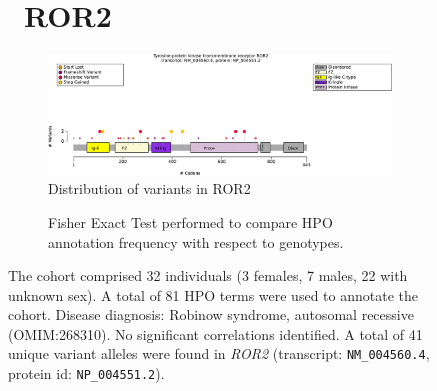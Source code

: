 \begin{figure}[htbp]
\section*{ ROR2}
\centering
\begin{subfigure}[b]{0.95\textwidth}
\centering
\includegraphics[width=\textwidth]{ img/ROR2_protein_diagram.pdf} 
\captionsetup{justification=raggedright,singlelinecheck=false}
\caption{Distribution of variants in ROR2}
\end{subfigure}

\vspace{2em}

\begin{subfigure}[b]{0.95\textwidth}
\centering
{}
\captionsetup{justification=raggedright,singlelinecheck=false}
\caption{Fisher Exact Test performed to compare HPO annotation frequency with respect to genotypes.}
\end{subfigure}

\vspace{2em}

\caption{The cohort comprised 32 individuals (3 females, 7 males, 22 with unknown sex). 
A total of 81 HPO terms were used to annotate the cohort. 
Disease diagnosis: Robinow syndrome, autosomal recessive (OMIM:268310). No significant correlations identified.
A total of 41 unique variant alleles were found in \textit{ROR2} (transcript: \texttt{NM\_004560.4}, protein id: \texttt{NP\_004551.2}).}
\end{figure}
